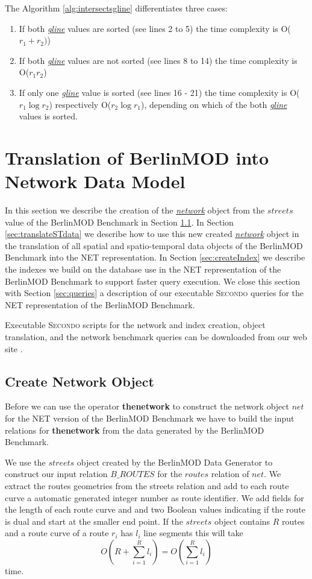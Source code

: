 \documentclass[a4paper]{article}
\newcommand{\secondo}{\textsc{Secondo}}
\newcommand{\bmodb} {BerlinMOD Benchmark}
\newcommand{\op}[1]{\textbf{#1}}
\newcommand{\dt}[1]{\textsl{\underline{#1}}}
\begin{document}
The Algorithm \ref{alg:intersectsgline} differentiates three cases:
\begin{enumerate}
\item If both \dt{gline} values are sorted (see lines 2 to 5) the time complexity
is O($r_1 + r_2)$)
\item If both \dt{gline} values are not sorted (see lines 8 to 14) the time
complexity is O($r_1r_2$)
\item If only one \dt{gline} value is sorted (see lines 16 - 21) the time
complexity is O($r_1 \log r_2$) respectively O($r_2 \log r_1$), depending on
which of the both \dt{gline} values is sorted.
\end{enumerate}
\section{Translation of BerlinMOD into Network Data Model}
\label{sec:Translation}
In this section we describe the creation of the \dt{network} object from the
$streets$ value of the \bmodb{} in Section \ref{sec:createNetwork}. In Section
\ref{sec:translateSTdata} we describe how to use this new created \dt{network}
object in the translation of all spatial and spatio-temporal data objects of the
\bmodb{} into the NET representation.
In Section \ref{sec:createIndex} we describe the indexes we build on the database
use in the NET representation of the \bmodb{} to support faster query execution.
We close this section with Section \ref{sec:queries} a description of our
executable \secondo{} queries for the NET representation of the \bmodb{}.

Executable \secondo{} scripts for the network and index creation, object
translation, and the network benchmark queries can be downloaded from our web
site \cite{NetworkWeb}.
\subsection{Create Network Object}
\label{sec:createNetwork}
Before we can use the operator \op{thenetwork} to construct the network object
$net$ for the NET version of the \bmodb{} we have to build the input relations
for \op{thenetwork} from the data generated by the \bmodb{}.

We use the $streets$ object created by the BerlinMOD Data Generator to construct
our input relation $B\_ROUTES$ for the $routes$ relation of $net$. We extract the
routes geometries from the streets relation and add to each route curve a
automatic generated integer number as route identifier. We add fields for the
length of each route curve and and two Boolean values indicating if the route is
dual and start at the smaller end point. If the $streets$ object contains $R$
routes and a route curve of a route $r_i$ has $l_i$ line segments this will take
\[O(R + \sum_{i=1}^{R}{l_i}) = O(\sum_{i=1}^{R}{l_i})\]
time.
\end{document}
